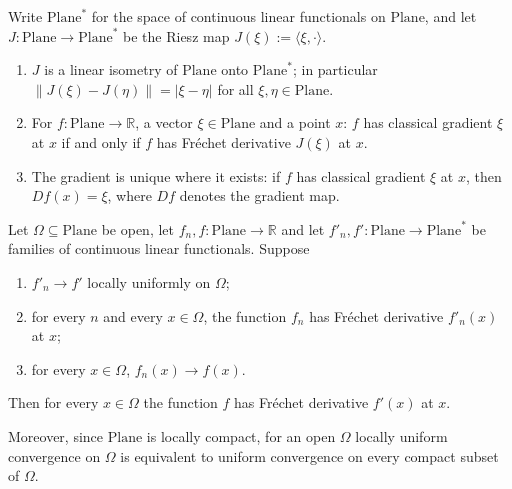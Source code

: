 \begin{proposition}
Write $\mathrm{Plane}^{*}$ for the space of continuous linear functionals on $\mathrm{Plane}$,
and let $J\colon\mathrm{Plane}\to\mathrm{Plane}^{*}$ be the Riesz map
$J(\xi):=\langle\xi,\cdot\rangle$.
\begin{enumerate}
\item $J$ is a linear isometry of $\mathrm{Plane}$ onto $\mathrm{Plane}^{*}$; in particular
$\lVert J(\xi)-J(\eta)\rVert=\lvert\xi-\eta\rvert$ for all $\xi,\eta\in\mathrm{Plane}$.
\item For $f\colon\mathrm{Plane}\to\mathbb{R}$, a vector $\xi\in\mathrm{Plane}$ and a point $x$:
$f$ has classical gradient $\xi$ at $x$ if and only if $f$ has Fr\'echet derivative $J(\xi)$ at
$x$.
\item The gradient is unique where it exists: if $f$ has classical gradient $\xi$ at $x$, then
$Df(x)=\xi$, where $Df$ denotes the gradient map.
\end{enumerate}
\end{proposition}

\begin{proposition}
Let $\Omega\subseteq\mathrm{Plane}$ be open, let $f_n,f\colon\mathrm{Plane}\to\mathbb{R}$ and let
$f'_n,f'\colon\mathrm{Plane}\to\mathrm{Plane}^{*}$ be families of continuous linear functionals.
Suppose
\begin{enumerate}
\item $f'_n\to f'$ locally uniformly on $\Omega$;
\item for every $n$ and every $x\in\Omega$, the function $f_n$ has Fr\'echet derivative
$f'_n(x)$ at $x$;
\item for every $x\in\Omega$, $f_n(x)\to f(x)$.
\end{enumerate}
Then for every $x\in\Omega$ the function $f$ has Fr\'echet derivative $f'(x)$ at $x$.

Moreover, since $\mathrm{Plane}$ is locally compact, for an open $\Omega$ locally uniform
convergence on $\Omega$ is equivalent to uniform convergence on every compact subset of
$\Omega$.
\end{proposition}

